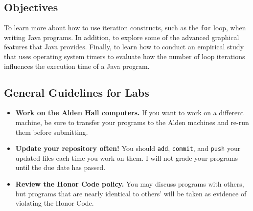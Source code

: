 




\vspace{-0.2in}
\subsection*{Objectives}
\vspace{-0.05in}

To learn more about how to use iteration constructs, such as the {\tt for} loop, when writing Java programs. In
addition, to explore some of the advanced graphical features that Java provides.  Finally, to learn how to conduct an
empirical study that uses operating system timers to evaluate how the number of loop iterations influences the execution
time of a Java program.

\vspace{-0.15in}
\subsection*{General Guidelines for Labs}
\vspace{-0.05in}

\begin{itemize}

\item {\bf Work on the Alden Hall computers.} If you want to work on a different machine, be sure to transfer your
  programs to the Alden machines and re-run them before submitting.

\item {\bf Update your repository often!} You should {\tt add}, {\tt commit}, and {\tt push} your updated files each
  time you work on them.  I will not grade your programs until the due date has passed.

\item {\bf Review the Honor Code policy.} You may discuss programs with others, but programs that are nearly identical
  to others' will be taken as evidence of violating the Honor Code.

\end{itemize}

\vspace{-0.25in}
